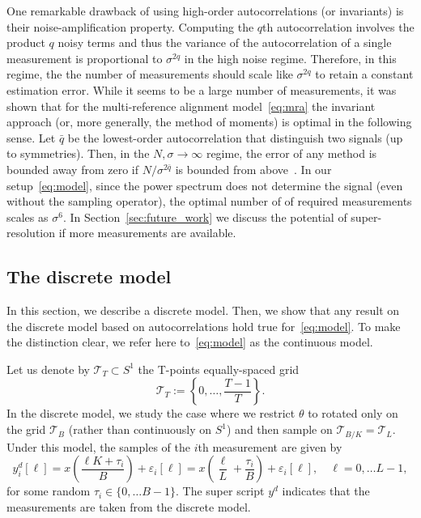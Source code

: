 \documentclass[english,12pt]{article}
\newcommand{\T}{\mathcal{T}}
\numberwithin{equation}{section}
\numberwithin{thm}{section} %
\begin{document}
One remarkable drawback of using high-order autocorrelations (or invariants) is their noise-amplification property. Computing the $q$th  autocorrelation involves the product $q$ noisy terms and thus the variance of the autocorrelation of a single measurement is proportional to $\sigma^{2q}$ in the high noise regime. Therefore, in this regime, the the number of measurements should scale like $\sigma^{2q}$ to retain a constant estimation error. While it seems to be a large number of measurements, it was shown that for the multi-reference alignment model~\eqref{eq:mra} the invariant approach (or, more generally, the method of moments) is optimal in the following sense. Let $\bar{q}$ be the lowest-order autocorrelation that distinguish two signals (up to symmetries). Then, in the $N,\sigma\to\infty$ regime, the error of any method is bounded away from zero if  $N/\sigma^{2\bar{q}}$ is bounded from above~\cite{bandeira2017optimal,abbe2018estimation}. 
In our setup~\eqref{eq:model}, since the power spectrum does not determine the signal (even without the sampling operator), the optimal number of of required measurements scales as $\sigma^6$. In Section~\ref{sec:future_work} we discuss the potential of super-resolution if more measurements are available.


\subsection{The discrete model} \label{sec:discrete_analysis}

In this section, we describe a discrete model. Then, we show that
any result on the discrete model based on autocorrelations hold true for~\eqref{eq:model}. To make the distinction clear, we refer here to~\eqref{eq:model} as the continuous model.

Let us denote by $\T_T\subset S^1$ the T-points equally-spaced grid 
 \begin{equation} \label{eq:grid}
 \mathcal{T}_T:=\left\{0,\ldots,\frac{T-1}{T}\right\}.
 \end{equation}
 In the discrete model, we study the case where we restrict $\theta$ to rotated only on the grid $\T_B$ (rather than continuously on $S^1$) and then sample on $\T_{B/K}=\T_{L}$.
 Under this model, the samples of the $i$th measurement are given by
 \begin{equation} \label{eq:discrete_model}
 y_i^d[\ell] = x\left(\frac{\ell K+\tau_i}{B}\right) + \varepsilon_i[\ell]=x\left(\frac{\ell}{L} + \frac{\tau_i}{B}\right)+\varepsilon_i[\ell], \quad \ell=0,\ldots L-1,
 \end{equation}
 for some random $\tau_i\in\{0,\ldots B-1\}$. The super script $y^d$ indicates that the measurements are taken from the discrete model. 
\end{document}
